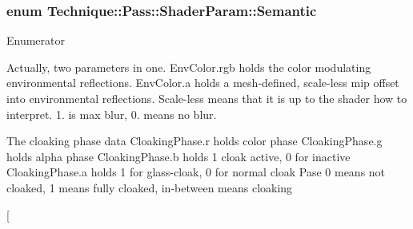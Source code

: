 \subsubsection[{\texorpdfstring{Semantic}{Semantic}}]{\setlength{\rightskip}{0pt plus 5cm}enum {\bf Technique\+::\+Pass\+::\+Shader\+Param\+::\+Semantic}}\hypertarget{structTechnique_1_1Pass_1_1ShaderParam_adfc05401be5223ca462814070a09c776}{}\label{structTechnique_1_1Pass_1_1ShaderParam_adfc05401be5223ca462814070a09c776}
\begin{Desc}
\item[Enumerator]\par
\begin{description}
\item[{\em 
Env\+Color\hypertarget{structTechnique_1_1Pass_1_1ShaderParam_adfc05401be5223ca462814070a09c776ab86f7a47cd15ce60393637113a16ff8c}{}\label{structTechnique_1_1Pass_1_1ShaderParam_adfc05401be5223ca462814070a09c776ab86f7a47cd15ce60393637113a16ff8c}
}]Actually, two parameters in one. Env\+Color.\+rgb holds the color modulating environmental reflections. Env\+Color.\+a holds a mesh-\/defined, scale-\/less mip offset into environmental reflections. Scale-\/less means that it is up to the shader how to interpret. 1. is max blur, 0. means no blur. \item[{\em 
Cloaking\+Phase\hypertarget{structTechnique_1_1Pass_1_1ShaderParam_adfc05401be5223ca462814070a09c776adfa70016641c09885e19d41d14e28331}{}\label{structTechnique_1_1Pass_1_1ShaderParam_adfc05401be5223ca462814070a09c776adfa70016641c09885e19d41d14e28331}
}]The cloaking phase data Cloaking\+Phase.\+r holds color phase Cloaking\+Phase.\+g holds alpha phase Cloaking\+Phase.\+b holds 1 cloak active, 0 for inactive Cloaking\+Phase.\+a holds 1 for glass-\/cloak, 0 for normal cloak Pase 0 means not cloaked, 1 means fully cloaked, in-\/between means cloaking \item[{\em 
}
\end{description}
\end{Desc}
